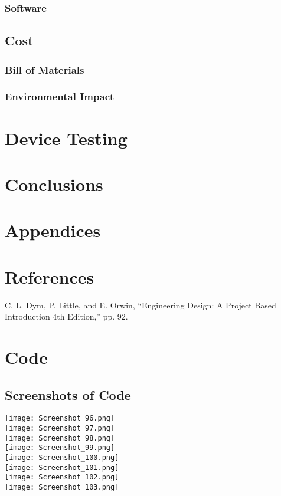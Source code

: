 \documentclass{article}
\begin{document}
\subsubsection{Software}

\subsection{Cost}
\subsubsection{Bill of Materials}
\subsubsection{Environmental Impact}

\newpage
\section{Device Testing}

\newpage
\section{Conclusions}

\newpage
\appendix
\section*{Appendices}
\section{References}

\begin{enumerate}[start=1,label={[\bfseries \arabic*]}]
    \item C. L. Dym, P. Little, and E. Orwin, “Engineering Design: A Project Based Introduction 4th Edition,” pp. 92.
\end{enumerate}

\section{Code}
\subsection{Screenshots of Code}

\texttt{[image: Screenshot\_96.png]}\\
\texttt{[image: Screenshot\_97.png]}\\
\texttt{[image: Screenshot\_98.png]}\\
\texttt{[image: Screenshot\_99.png]}\\
\texttt{[image: Screenshot\_100.png]}\\
\texttt{[image: Screenshot\_101.png]}\\
\texttt{[image: Screenshot\_102.png]}\\
\texttt{[image: Screenshot\_103.png]}\\
\end{document}
